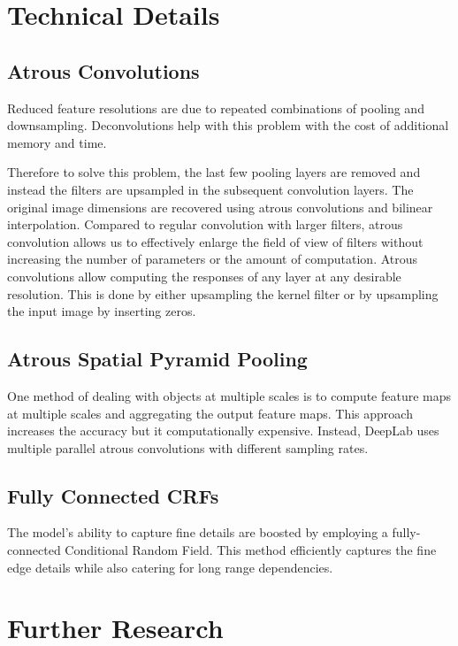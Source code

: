\documentclass[10pt,twocolumn,letterpaper]{article}
\begin{document}
\section{Technical Details}
\subsection{Atrous Convolutions}
Reduced feature resolutions are due to repeated combinations of pooling and downsampling.
Deconvolutions help with this problem with the cost of additional memory and time.

Therefore to solve this problem, the last few pooling layers are removed and instead the
filters are upsampled in the subsequent convolution layers. The original image dimensions
are recovered using atrous convolutions and bilinear interpolation. Compared to regular
convolution with larger filters, atrous convolution allows us to effectively enlarge the
field of view of filters without increasing the number of parameters or the amount of
computation.
Atrous convolutions allow computing the responses of any layer at any desirable resolution.
This is done by either upsampling the kernel filter or by upsampling the input image by
inserting zeros.

\subsection{Atrous Spatial Pyramid Pooling}
One method of dealing with objects at multiple scales is to compute feature maps at
multiple scales and aggregating the output feature maps. This approach increases
the accuracy but it computationally expensive. Instead, DeepLab uses multiple parallel
atrous convolutions with different sampling rates.

\subsection{Fully Connected CRFs}
The model's ability to capture fine details are boosted by employing a fully-connected
Conditional Random Field. This method efficiently captures the fine edge details while
also catering for long range dependencies.

\section{Further Research}

{\small   }
\end{document}
